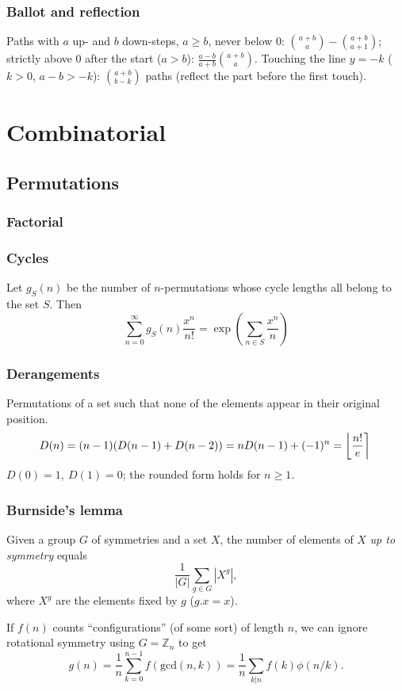 
	\subsection{Ballot and reflection}
	Paths with $a$ up- and $b$ down-steps, $a\ge b$, never below 0: $\binom{a+b}a-\binom{a+b}{a+1}$; strictly above 0 after the start ($a>b$): $\frac{a-b}{a+b}\binom{a+b}a$.
	Touching the line $y=-k$ ($k>0$, $a-b>-k$): $\binom{a+b}{b-k}$ paths (reflect the part before the first touch).
\chapter{Combinatorial}

\section{Permutations}
	\subsection{Factorial}
		

	\subsection{Cycles}
		Let $g_S(n)$ be the number of $n$-permutations whose cycle lengths all belong to the set $S$. Then
		$$\sum_{n=0} ^\infty g_S(n) \frac{x^n}{n!} = \exp\left(\sum_{n\in S} \frac{x^n} {n} \right)$$

	\subsection{Derangements}
		Permutations of a set such that none of the elements appear in their original position.
		\[ \mkern-2mu D(n) = (n-1)(D(n-1)+D(n-2)) = n D(n-1)+(-1)^n = \left\lfloor\frac{n!}{e}\right\rceil \]
		$D(0)=1,\ D(1)=0$; the rounded form holds for $n \ge 1$.

	\subsection{Burnside's lemma}
		Given a group $G$ of symmetries and a set $X$, the number of elements of $X$ \emph{up to symmetry} equals
		 \[ {\frac {1}{|G|}}\sum _{{g\in G}}|X^{g}|, \]
		 where $X^{g}$ are the elements fixed by $g$ ($g.x = x$).

		 If $f(n)$ counts ``configurations'' (of some sort) of length $n$, we can ignore rotational symmetry using $G = \mathbb Z_n$ to get
		 \[ g(n) = \frac 1 n \sum_{k=0}^{n-1}{f(\text{gcd}(n, k))} = \frac 1 n \sum_{k|n}{f(k)\phi(n/k)}. \]

